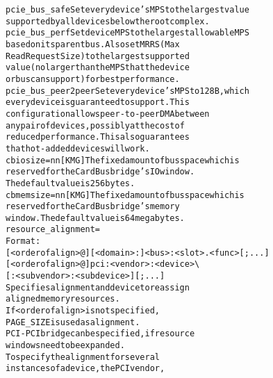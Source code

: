 \documentclass[a4paper,8pt,english]{sphinxmanual}
\begin{document}
\begin{alltt}
                pcie\_bus\_safe   Set every device's MPS to the largest value
                                supported by all devices below the root complex.
                pcie\_bus\_perf   Set device MPS to the largest allowable MPS
                                based on its parent bus. Also set MRRS (Max
                                Read Request Size) to the largest supported
                                value (no larger than the MPS that the device
                                or bus can support) for best performance.
                pcie\_bus\_peer2peer      Set every device's MPS to 128B, which
                                every device is guaranteed to support. This
                                configuration allows peer-to-peer DMA between
                                any pair of devices, possibly at the cost of
                                reduced performance.  This also guarantees
                                that hot-added devices will work.
                cbiosize=nn{[}KMG{]}        The fixed amount of bus space which is
                                reserved for the CardBus bridge's IO window.
                                The default value is 256 bytes.
                cbmemsize=nn{[}KMG{]}       The fixed amount of bus space which is
                                reserved for the CardBus bridge's memory
                                window. The default value is 64 megabytes.
                resource\_alignment=
                                Format:
                                {[}\textless{}order of align\textgreater{}@{]}{[}\textless{}domain\textgreater{}:{]}\textless{}bus\textgreater{}:\textless{}slot\textgreater{}.\textless{}func\textgreater{}{[}; ...{]}
                                {[}\textless{}order of align\textgreater{}@{]}pci:\textless{}vendor\textgreater{}:\textless{}device\textgreater{}\textbackslash{}
                                                {[}:\textless{}subvendor\textgreater{}:\textless{}subdevice\textgreater{}{]}{[}; ...{]}
                                Specifies alignment and device to reassign
                                aligned memory resources.
                                If \textless{}order of align\textgreater{} is not specified,
                                PAGE\_SIZE is used as alignment.
                                PCI-PCI bridge can be specified, if resource
                                windows need to be expanded.
                                To specify the alignment for several
                                instances of a device, the PCI vendor,

\end{alltt}
\end{document}
